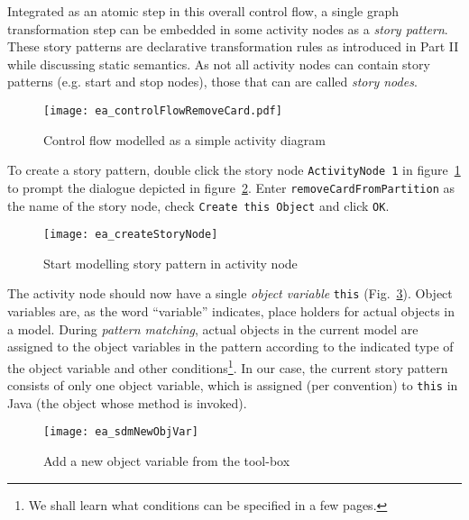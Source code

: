 \label{story-pattern}
Integrated as an atomic step in this overall control flow, a single graph  transformation step can be embedded in some activity nodes as a
\emph{story pattern}.  These story patterns are declarative transformation rules as introduced in Part II while discussing static semantics.  As not all 
activity nodes can contain story patterns (e.g. start and stop nodes), those that can are called \emph{story nodes}.

\begin{figure}[htp]
\begin{center}
  \texttt{[image: ea\_controlFlowRemoveCard.pdf]}
  \caption{Control flow modelled as a simple activity diagram}  
  \label{fig:sdm_complete_control_flow_simple}
\end{center}
\end{figure}

To create a story pattern, double click the story node \texttt{ActivityNode 1} in figure~\ref{fig:sdm_complete_control_flow_simple} to prompt the dialogue
depicted in figure~\ref{fig:story_pattern}.  Enter \texttt{remove\-Card\-From\-Partition} as the name of the story node, check \texttt{Create this Object} and
click \texttt{OK}.

\begin{figure}[htpb]
\begin{center} 
  \texttt{[image: ea\_createStoryNode]}
  \caption{Start modelling story pattern in activity node}  
  \label{fig:story_pattern}
\end{center}
\end{figure}

The activity node should now have a single \emph{object variable} \texttt{this} (Fig.~\ref{fig:tool_box}). Object variables are, as the
word ``variable'' indicates, place holders for actual objects in a model.  During \emph{pattern matching}, actual objects in the 
current model are assigned to the object variables in the pattern according to  the indicated type of the object variable and other conditions\footnote{We shall
learn what conditions can be specified in a few pages.}.  In our case, the current story pattern consists of only one object variable, which is assigned (per
convention) to \texttt{this} in Java (the object whose method is invoked).

\begin{figure}[htp]
\begin{center}
  \texttt{[image: ea\_sdmNewObjVar]}
  \caption{Add a new object variable from the tool-box}  
  \label{fig:tool_box}
\end{center}
\end{figure}

